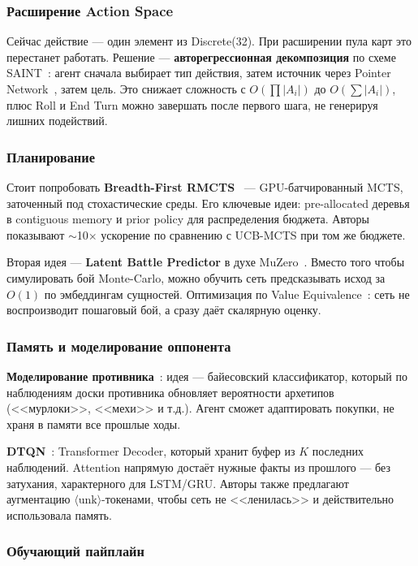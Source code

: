 \documentclass[a4paper,12pt]{extarticle}
\begin{document}
\subsubsection{Расширение Action Space}

Сейчас действие --- один элемент из Discrete(32). При расширении пула карт это перестанет работать. Решение --- \textbf{авторегрессионная декомпозиция} по схеме SAINT~\cite{saint}: агент сначала выбирает тип действия, затем источник через Pointer Network~\cite{pointer}, затем цель. Это снижает сложность с $O(\prod |A_i|)$ до $O(\sum |A_i|)$, плюс Roll и End Turn можно завершать после первого шага, не генерируя лишних подействий.

\subsubsection{Планирование}

Стоит попробовать \textbf{Breadth-First RMCTS}~\cite{rmcts} --- GPU-батчированный MCTS, заточенный под стохастические среды. Его ключевые идеи: pre-allocated деревья в contiguous memory и prior policy для распределения бюджета. Авторы показывают $\sim$10$\times$ ускорение по сравнению с UCB-MCTS при том же бюджете.

Вторая идея --- \textbf{Latent Battle Predictor} в духе MuZero~\cite{muzero}. Вместо того чтобы симулировать бой Monte-Carlo, можно обучить сеть предсказывать исход за $O(1)$ по эмбеддингам сущностей. Оптимизация по Value Equivalence~\cite{value_equiv}: сеть не воспроизводит пошаговый бой, а сразу даёт скалярную оценку.

\subsubsection{Память и моделирование оппонента}

\textbf{Моделирование противника}~\cite{opponent}: идея --- байесовский классификатор, который по наблюдениям доски противника обновляет вероятности архетипов (<<мурлоки>>, <<мехи>> и т.д.). Агент сможет адаптировать покупки, не храня в памяти все прошлые ходы.

\textbf{DTQN}~\cite{dtqn}: Transformer Decoder, который хранит буфер из $K$ последних наблюдений. Attention напрямую достаёт нужные факты из прошлого --- без затухания, характерного для LSTM/GRU. Авторы также предлагают аугментацию $\langle\text{unk}\rangle$-токенами, чтобы сеть не <<ленилась>> и действительно использовала память.

\subsubsection{Обучающий пайплайн}
\end{document}
